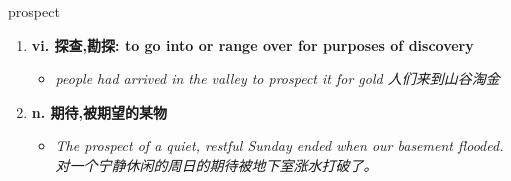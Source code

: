 
\begin{frame}
{\huge prospect}
\begin{center}
\begin{enumerate}\Large
  \item \textbf{vi. 探查,勘探: to go into or range over for purposes of discovery}
  \begin{itemize}
    \item \em{\Large{people had arrived in the valley to prospect it for gold 人们来到山谷淘金}}
  \end{itemize}
  \item \textbf{n. 期待,被期望的某物}
  \begin{itemize}
    \item \em{\Large{The prospect of a quiet, restful Sunday ended when our basement flooded. 对一个宁静休闲的周日的期待被地下室涨水打破了。}}
  \end{itemize}
\end{enumerate}
\end{center}
\end{frame}
